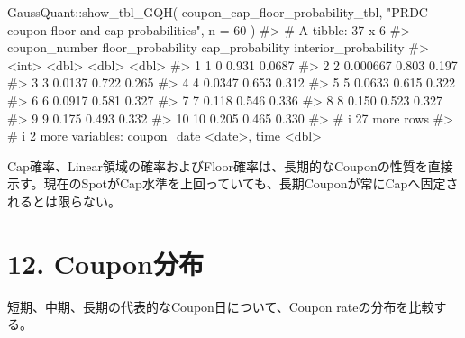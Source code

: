 \documentclass[
  letterpaper,
  DIV=11,
  numbers=noendperiod]{scrreprt}
\newenvironment{Shaded}{\begin{snugshade}}{\end{snugshade}}
\newcommand{\AttributeTok}[1]{\textcolor[rgb]{0.40,0.45,0.13}{#1}}
\newcommand{\CommentTok}[1]{\textcolor[rgb]{0.37,0.37,0.37}{#1}}
\newcommand{\DecValTok}[1]{\textcolor[rgb]{0.68,0.00,0.00}{#1}}
\newcommand{\FunctionTok}[1]{\textcolor[rgb]{0.28,0.35,0.67}{#1}}
\newcommand{\NormalTok}[1]{\textcolor[rgb]{0.00,0.23,0.31}{#1}}
\newcommand{\SpecialCharTok}[1]{\textcolor[rgb]{0.37,0.37,0.37}{#1}}
\newcommand{\StringTok}[1]{\textcolor[rgb]{0.13,0.47,0.30}{#1}}
\begin{document}
\begin{Shaded}
\begin{Highlighting}[]
\NormalTok{GaussQuant}\SpecialCharTok{::}\FunctionTok{show\_tbl\_GQH}\NormalTok{(}
\NormalTok{  coupon\_cap\_floor\_probability\_tbl,}
  \StringTok{"PRDC coupon floor and cap probabilities"}\NormalTok{,}
  \AttributeTok{n =} \DecValTok{60}
\NormalTok{)}
\CommentTok{\#\textgreater{} \# A tibble: 37 x 6}
\CommentTok{\#\textgreater{}    coupon\_number floor\_probability cap\_probability interior\_probability}
\CommentTok{\#\textgreater{}            \textless{}int\textgreater{}             \textless{}dbl\textgreater{}           \textless{}dbl\textgreater{}                \textless{}dbl\textgreater{}}
\CommentTok{\#\textgreater{}  1             1          0                  0.931               0.0687}
\CommentTok{\#\textgreater{}  2             2          0.000667           0.803               0.197 }
\CommentTok{\#\textgreater{}  3             3          0.0137             0.722               0.265 }
\CommentTok{\#\textgreater{}  4             4          0.0347             0.653               0.312 }
\CommentTok{\#\textgreater{}  5             5          0.0633             0.615               0.322 }
\CommentTok{\#\textgreater{}  6             6          0.0917             0.581               0.327 }
\CommentTok{\#\textgreater{}  7             7          0.118              0.546               0.336 }
\CommentTok{\#\textgreater{}  8             8          0.150              0.523               0.327 }
\CommentTok{\#\textgreater{}  9             9          0.175              0.493               0.332 }
\CommentTok{\#\textgreater{} 10            10          0.205              0.465               0.330 }
\CommentTok{\#\textgreater{} \# i 27 more rows}
\CommentTok{\#\textgreater{} \# i 2 more variables: coupon\_date \textless{}date\textgreater{}, time \textless{}dbl\textgreater{}}
\end{Highlighting}
\end{Shaded}

Cap確率、Linear領域の確率およびFloor確率は、長期的なCouponの性質を直接示す。現在のSpotがCap水準を上回っていても、長期Couponが常にCapへ固定されるとは限らない。

\section{12. Coupon分布}\label{couponux5206ux5e03}

短期、中期、長期の代表的なCoupon日について、Coupon
rateの分布を比較する。
\end{document}
